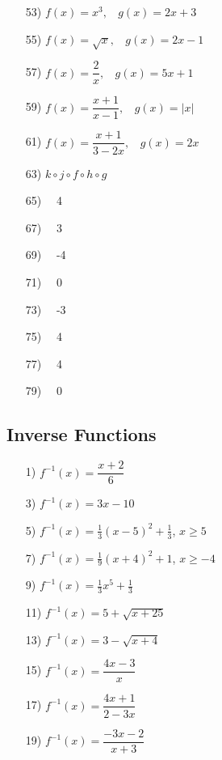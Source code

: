 \documentclass[11pt]{book}
\theoremstyle{definition}  %
\begin{document}
\begin{multicols}{2}
\begin{enumerate}
\item[53)] $f(x)=x^3,~~~~g(x)=2x+3$
\item[55)] $f(x)=\sqrt{x},~~~~g(x)=2x-1$
\item[57)] $f(x)=\dfrac{2}{x},~~~~g(x)=5x+1$
\item[59)] $f(x)=\dfrac{x+1}{x-1},~~~~g(x)=|x|$
\item[61)] $f(x)=\dfrac{x+1}{3-2x},~~~~g(x)=2x$
\item[63)] $k\circ j\circ f\circ h\circ g$
\end{enumerate}
\end{multicols}
\begin{multicols}{4}
\begin{enumerate}
\item[65)]~~4
\item[67)]~~3
\item[69)]~~-4
\item[71)]~~0
\item[73)]~~-3
\item[75)]~~4
\item[77)]~~4
\item[79)]~~0
\end{enumerate}
\end{multicols}

\newpage
\subsection*{Inverse Functions}

\begin{multicols}{2}
\begin{enumerate}
\item[1)] $f^{-1}(x) = \dfrac{x + 2}{6}$
\item[3)] $f^{-1}(x) = 3x-10$
\item[5)] $f^{-1}(x) = \frac{1}{3}(x-5)^2+\frac{1}{3}$, $x \geq 5$
\item[7)] $f^{-1}(x) = \frac{1}{9}(x+4)^2+1$, $x \geq -4$
\item[9)] $f^{-1}(x) = \frac{1}{3} x^{5} + \frac{1}{3}$
\item[11)] $f^{-1}(x) = 5 + \sqrt{x+25}$
\item[13)] $f^{-1}(x) = 3 - \sqrt{x+4}$
\item[15)] $f^{-1}(x) = \dfrac{4x-3}{x}$
\item[17)] $f^{-1}(x) = \dfrac{4x+1}{2-3x}$
\item[19)] $f^{-1}(x) = \dfrac{-3x - 2}{x + 3}$
\end{enumerate}
\end{multicols}
\end{document}

